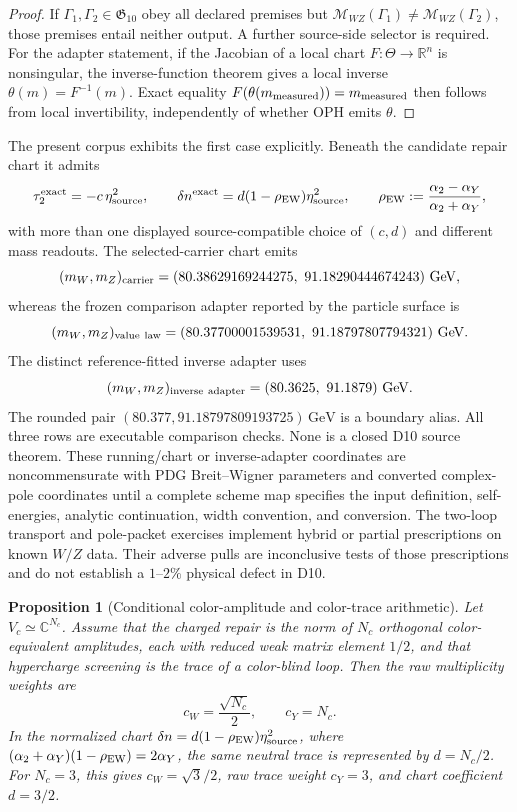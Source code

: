 \documentclass[11pt]{article}
\newtheorem{proposition}[theorem]{Proposition}
\begin{document}
\begin{proof}
If \(\Gamma_1,\Gamma_2\in\mathfrak G_{10}\) obey all declared premises but
\(\mathcal M_{WZ}(\Gamma_1)\ne\mathcal M_{WZ}(\Gamma_2)\), those premises
entail neither output.  A further source-side selector is required.  For the
adapter statement, if the Jacobian of a local chart \(F:\Theta\to\mathbb R^n\)
is nonsingular, the inverse-function theorem gives a local inverse
\(\theta(m)=F^{-1}(m)\).  Exact equality
\(F(\theta(m_{\rm measured}))=m_{\rm measured}\) then follows from local
invertibility, independently of whether OPH emits \(\theta\).
\end{proof}

The present corpus exhibits the first case explicitly.  Beneath the candidate
repair chart it admits
\[
\tau_2^{\rm exact}=-c\,\eta_{\rm source}^2,
\qquad
\delta n^{\rm exact}=d(1-\rho_{\rm EW})\eta_{\rm source}^2,
\qquad
\rho_{\rm EW}:=\frac{\alpha_2-\alpha_Y}{\alpha_2+\alpha_Y},
\]
with more than one displayed source-compatible choice of \((c,d)\) and
different mass readouts.  The selected-carrier chart emits
\[
(m_W,m_Z)_{\rm carrier}
=(80.38629169244275,\ 91.18290444674243)\ {\rm GeV},
\]
whereas the frozen comparison adapter reported by the particle surface is
\[
(m_W,m_Z)_{\rm value\ law}
=(80.37700001539531,\ 91.18797807794321)\ {\rm GeV}.
\]
The distinct reference-fitted inverse adapter uses
\[
(m_W,m_Z)_{\rm inverse\ adapter}
=(80.3625,\ 91.1879)\ {\rm GeV}.
\]
The rounded pair \((80.377,91.18797809193725)\,\mathrm{GeV}\) is a boundary
alias. All three rows are executable comparison checks.
None is a closed D10 source theorem. These running/chart or inverse-adapter coordinates are
noncommensurate with PDG Breit--Wigner parameters and converted complex-pole coordinates until a
complete scheme map specifies the input definition, self-energies, analytic continuation, width
convention, and conversion. The two-loop transport and pole-packet exercises implement
hybrid or partial prescriptions on known \(W/Z\) data. Their adverse pulls are inconclusive tests of
those prescriptions and do not establish a \(1\)--\(2\%\) physical defect in D10.

\begin{proposition}[Conditional color-amplitude and color-trace
arithmetic]\label{prop:conditional-ew-color-weights}
Let \(V_c\simeq\mathbb C^{N_c}\).  Assume that the charged repair is the norm
of \(N_c\) orthogonal color-equivalent amplitudes, each with reduced weak
matrix element \(1/2\), and that hypercharge screening is the trace of a
color-blind loop.  Then the raw multiplicity weights are
\[
c_W=\frac{\sqrt{N_c}}2,
\qquad
c_Y=N_c.
\]
In the normalized chart
\(\delta n=d(1-\rho_{\rm EW})\eta_{\rm source}^2\), where
\((\alpha_2+\alpha_Y)(1-\rho_{\rm EW})=2\alpha_Y\), the same neutral trace is
represented by \(d=N_c/2\).  For \(N_c=3\), this gives
\(c_W=\sqrt3/2\), raw trace weight \(c_Y=3\), and chart coefficient
\(d=3/2\).
\end{proposition}
\end{document}
